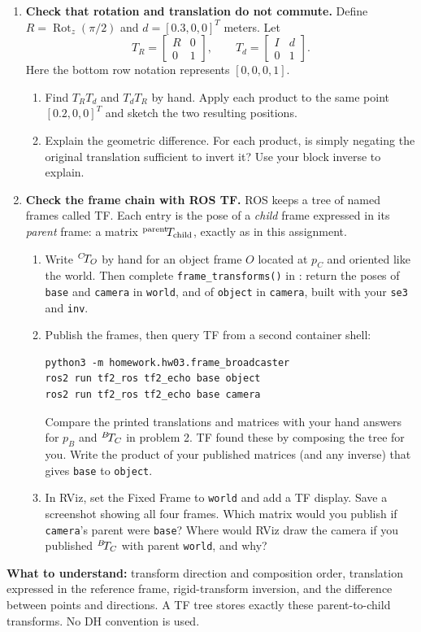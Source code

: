 \newpage
\begin{enumerate}[start=3]
\item \textbf{Check that rotation and translation do not commute.}
Define $R=\operatorname{Rot}_z(\pi/2)$ and $d=[0.3,0,0]^T$ meters. Let
\[
T_R=\begin{bmatrix}R&0\\0&1\end{bmatrix},\qquad
T_d=\begin{bmatrix}I&d\\0&1\end{bmatrix}.
\]
Here the bottom row notation represents $[0,0,0,1]$.
\begin{enumerate}
\item Find $T_R T_d$ and $T_d T_R$ by hand. Apply each product to the
same point $[0.2,0,0]^T$ and sketch the two resulting positions.
\item Explain the geometric difference. For each product, is simply negating
the original translation sufficient to invert it? Use your block inverse to explain.
\end{enumerate}

\item \textbf{Check the frame chain with ROS TF.}
ROS keeps a tree of named frames called TF. Each entry is the pose of a
\emph{child} frame expressed in its \emph{parent} frame: a matrix
${}^{\text{parent}}\!T_{\text{child}}$, exactly as in this assignment.
\begin{enumerate}
\item Write ${}^{C}\!T_{O}$ by hand for an object frame $O$ located at $p_C$ and
oriented like the world. Then complete \texttt{frame\_transforms()} in
: return the poses of
\texttt{base} and \texttt{camera} in \texttt{world}, and of \texttt{object}
in \texttt{camera}, built with your \texttt{se3} and \texttt{inv}.
\item Publish the frames, then query TF from a second container shell:
\begin{lstlisting}
python3 -m homework.hw03.frame_broadcaster
ros2 run tf2_ros tf2_echo base object
ros2 run tf2_ros tf2_echo base camera
\end{lstlisting}
Compare the printed translations and matrices with your hand answers for
$p_B$ and ${}^{B}\!T_{C}$ in problem 2. TF found these by composing the tree for
you. Write the product of your published matrices (and any inverse) that
gives \texttt{base} to \texttt{object}.
\item In RViz, set the Fixed Frame to \texttt{world} and add a TF display.
Save a screenshot showing all four frames. Which matrix would you publish if
\texttt{camera}'s parent were \texttt{base}? Where would RViz draw the camera
if you published ${}^{B}\!T_{C}$ with parent \texttt{world}, and why?
\end{enumerate}
\end{enumerate}

\textbf{What to understand:} transform direction and composition order,
translation expressed in the reference frame, rigid-transform inversion,
and the difference between points and directions. A TF tree stores exactly
these parent-to-child transforms. No DH convention is used.

\submission

